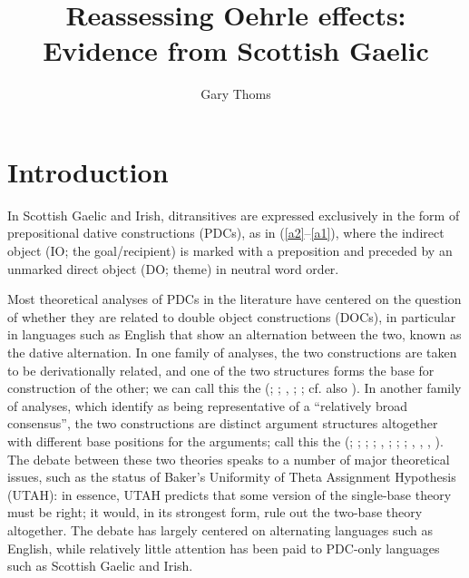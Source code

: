 \documentclass[output=paper,colorlinks,citecolor=brown]{langscibook}
\title{Reassessing Oehrle effects: Evidence from Scottish Gaelic}
\author{Gary Thoms\affiliation{New York University}}
\begin{document}
\maketitle


\section{Introduction}

In  Scottish Gaelic and Irish, ditransitives are expressed exclusively in the form of prepositional dative constructions (PDCs), as in (\ref{a2}--\ref{a1}), where the indirect object (IO; the goal/recipient) is marked with a preposition and preceded by an unmarked direct object (DO; theme) in neutral word order.



\noindent Most theoretical analyses of PDCs in the literature have centered on the question of whether they are related to double object constructions (DOCs), in particular in languages such as English that show an alternation between the two, known as the dative alternation. In one family of analyses, the two constructions are taken to be derivationally related, and one of the two structures forms the base for construction of the other; we can call this the  (\citealt{gt:Larson:1988}; \citealt{gt:Snyder:1997}; \citealt{gt:Ormazabal:2012}, \citeyear {gt:Ormazabal:2023}; \citealt{gt:Collins:2023}; cf. also \citealt{gt:Rappaport:2008}). In another family of analyses, which \citet{gt:Harley:2017} identify as being representative of a ``relatively broad consensus'', the two constructions are distinct argument structures altogether with different base positions for the arguments; call this the  (\citealt{gt:Green:1974}; \citealt{gt:Oehrle:1976}; \citealt{gt:Marantz:1993}; \citealt{gt:Pesetsky:1995}; \citealt{gt:Pylkkanen:2002a}, \citeyear{gt:Pylkkanen:2008}; \citealt{gt:Harley:2002a}; \citealt{gt:Harley:2015}; \citealt{gt:Bruening:2001a}, \citeyear{gt:Bruening:2010a}, \citeyear{gt:Bruening:2010b}, \citeyear{gt:Bruening:2018a}).  The debate between these two theories speaks to a number of major theoretical issues, such as the status of Baker's Uniformity of Theta Assignment Hypothesis (UTAH): in essence, UTAH predicts that some version of the single-base theory must be right; it would, in its strongest form, rule out the two-base theory altogether. The debate has largely centered on alternating languages such as English, while relatively little attention has been paid to PDC-only languages such as Scottish Gaelic and Irish. 
 
\end{document}
